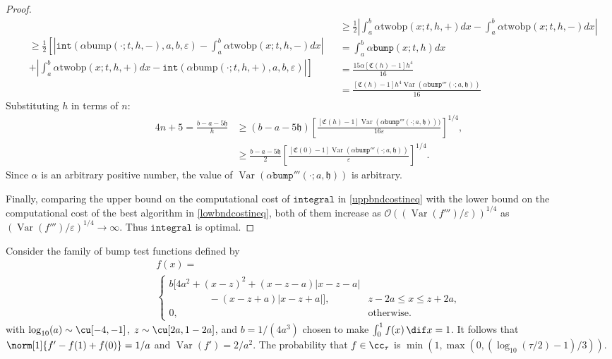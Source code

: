 \documentclass{iitthesis}
\DeclareMathOperator{\Var}{Var}
\theoremstyle{definition}
\theoremstyle{remark}
\begin{document}
\begin{proof}
\begin{subequations}
\begin{multline*}
  \end{multline*}
  \begin{multline*}
    \ge\frac{1}{2}\left[\right.\left|\texttt{int}(\alpha\text{bump}(\cdot;t,h,-),a,b,\varepsilon)-\int_{a}^{b}\alpha\text{twobp}(x;t,h,-)dx\right|\\
    +\left|\int_{a}^{b}\alpha\text{twobp}(x;t,h,+)dx-\texttt{int}(\alpha\text{bump}(\cdot;t,h,+),a,b,\varepsilon)\right|\left.\right]
  \end{multline*}
  \begin{align*}
     &\ge\frac{1}{2}\left|\int_{a}^{b}\alpha\text{twobp}(x;t,h,+)dx-\int_{a}^{b}\alpha\text{twobp}(x;t,h,-)dx\right|\\
     &=\int_{a}^{b}\alpha\texttt{bump}(x;t,h)dx\\
     &=\frac{15\alpha[\mathfrak{C}(h)-1]h^4}{16}\\
     &=\frac{[\mathfrak{C}(h)-1]h^4\Var(\alpha\texttt{bump}'''(\cdot;a,\mathfrak{h}))}{16}
  \end{align*}
  \end{subequations}
  Substituting $h$  in terms of $n$:
      \begin{align*}
        4n+5=\frac{b-a-5\mathfrak{h}}{h}&\ge(b-a-5\mathfrak{h})\left[\frac{[\mathfrak{C}(h)-1]\Var(\alpha \texttt{bump}'''(\cdot;a,\mathfrak{h})))}{16\varepsilon}\right]^{1/4},\\
        &\ge\frac{b-a-5\mathfrak{h}}{2}\left[\frac{[\mathfrak{C}(0)-1]\Var(\alpha \texttt{bump}'''(\cdot;a,\mathfrak{h}))}{\varepsilon}\right]^{1/4}.
    \end{align*}
    Since $\alpha$ is an arbitrary positive number, the value of $\Var(\alpha \texttt{bump}'''(\cdot;a,\mathfrak{h}))$ is arbitrary.

    Finally, comparing the upper bound on the computational cost of $\texttt{integral}$ in \eqref{uppbndcostineq} with the lower bound on the computational cost of the best algorithm in \eqref{lowbndcostineq}, both of them increase as $\mathcal{O}((\Var(f''')/\varepsilon))^{1/4}$ as $(\Var(f''')/\varepsilon)^{1/4}\rightarrow \infty$. Thus $\texttt{integral}$ is optimal.
\end{proof}




Consider the family of bump test functions defined by
\begin{multline}\label{testfun}
f(x)= \\
\begin{cases}
\displaystyle  b[4a^2 + (x-z)^2 + (x-z-a)|x-z-a|\\
\qquad \qquad -(x-z+a)|x-z+a|], & z-2a\leq x\leq z+2a,\\[2ex]
\displaystyle  0, & \text{otherwise}.
\end{cases}
\end{multline}
with  $\log_{10}(a) \sim \cu[-4,-1]$, $z \sim \cu[2a,1-2a]$, and $b=1/(4a^3)$ chosen to make $\int_0^1 f(x) \, \dif x = 1$.  It follows that $\norm[1]{f'-f(1)+f(0)}=1/a$ and $\Var(f')=2/a^2$.  The probability that $f \in \cc_{\tau}$ is $\min\left(1,\max(0,\left(\log_{10}(\tau/2)-1\right)/3)\right).$
\end{document}
